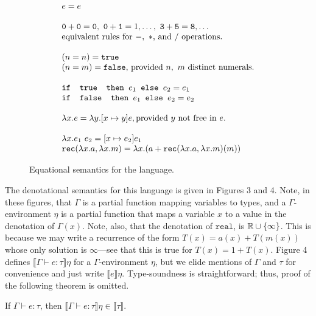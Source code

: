 \begin{figure}
\[
\begin{array}{lr}
e = e \\ \\
\texttt{0} + \texttt{0} = \texttt{0}, \ \texttt{0} + \texttt{1} = 1, \ldots, \ \texttt{3} + \texttt{5} = \texttt{8}, \ldots  \\
\text{equivalent rules for } -, \ * \text{, and } /\text{ operations.}
\\ \\
(n =n) = \texttt{true} \\ (n=m) = \texttt{false}\text{, provided } n, \ m \text{ distinct numerals.}\\ \\ 
\ifelse{\texttt{ true }}{e_1}{e_2} = e_1 \\
\ifelse{\texttt{ false }}{e_1}{e_2} = e_2 \\ \\ 
\lambda x.e = \lambda y.[x \mapsto y]e, \text{provided } y \text{ not free in } e. \\ \\ 
\lambda x.e_1 \ e_2 = [x \mapsto e_2]e_1 \\
\texttt{rec}(\lambda x.a, \lambda x.m) = 
			\lambda x.(a + \texttt{rec}(\lambda x.a, \lambda x.m)(m)) 
\end{array}
\]
\caption{Equational semantics for the language.}
\label{fig:sum-eq-sem}
\end{figure}

The denotational semantics for this language is given in Figures 3 and 4. Note, in these figures, that $\Gamma$ is a partial function mapping variables to types, and a
 $\Gamma$-environment $\eta$ is a partial function that maps a variable $x$ to a value in the
 denotation of $\Gamma(x)$. Note, also, that the denotation of $\texttt{real}$, is $\mathbb{R} \cup \{\infty\}$. This is because
 we may write a recurrence of the form $T(x) = a(x) + T(m(x))$ whose only solution is $\infty$---see that this is true
 for $T(x) = 1 + T(x)$.
 Figure 4 defines $\llbracket \Gamma \vdash e: \tau\rrbracket\eta$ for 
a $\Gamma$-environment $\eta$, but we elide mentions of $\Gamma$ and $\tau$ for convenience and just write
$\llbracket e\rrbracket\eta$. Type-soundness is straightforward; thus, proof of the following theorem is omitted.

\begin{thm}
If $\Gamma \vdash e:\tau$, then $\llbracket \Gamma \vdash e : \tau \rrbracket\eta \in \llbracket \tau \rrbracket$.
\end{thm}

